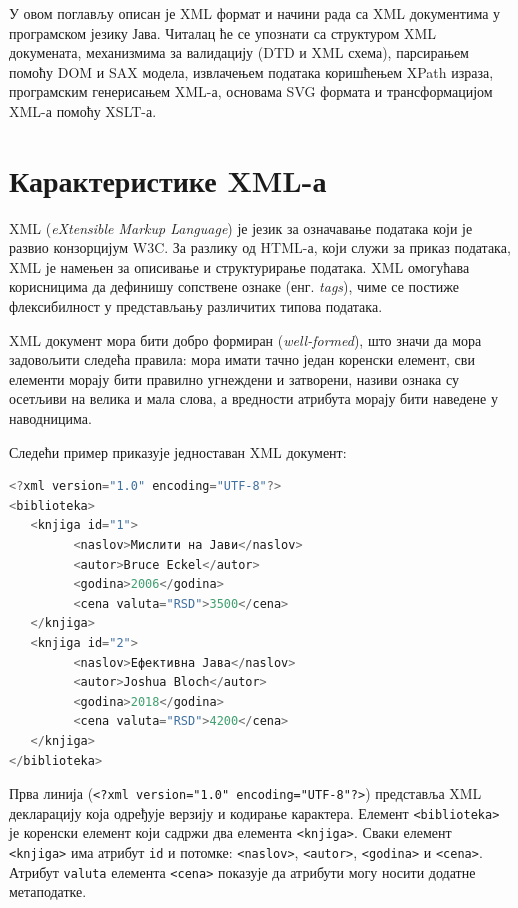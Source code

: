 У овом поглављу описан је XML формат и начини рада са XML документима у програмском језику Јава. Читалац ће се упознати са структуром XML докумената, механизмима за валидацију (DTD и XML схема), парсирањем помоћу DOM и SAX модела, извлачењем података коришћењем XPath израза, програмским генерисањем XML-а, основама SVG формата и трансформацијом XML-а помоћу XSLT-а.


\section{Карактеристике XML-а}

XML (\textit{eXtensible Markup Language}) је језик за означавање података који је развио конзорцијум W3C. За разлику од HTML-а, који служи за приказ података, XML је намењен за описивање и структурирање података. XML омогућава корисницима да дефинишу сопствене ознаке (енг. \textit{tags}), чиме се постиже флексибилност у представљању различитих типова података.

XML документ мора бити добро формиран (\textit{well-formed}), што значи да мора задовољити следећа правила: мора имати тачно један коренски елемент, сви елементи морају бити правилно угнеждени и затворени, називи ознака су осетљиви на велика и мала слова, а вредности атрибута морају бити наведене у наводницима.

Следећи пример приказује једноставан XML документ:


\begin{lstlisting}[language=Java]
<?xml version="1.0" encoding="UTF-8"?>
<biblioteka>
   <knjiga id="1">
         <naslov>Мислити на Јави</naslov>
         <autor>Bruce Eckel</autor>
         <godina>2006</godina>
         <cena valuta="RSD">3500</cena>
   </knjiga>
   <knjiga id="2">
         <naslov>Ефективна Јава</naslov>
         <autor>Joshua Bloch</autor>
         <godina>2018</godina>
         <cena valuta="RSD">4200</cena>
   </knjiga>
</biblioteka>
\end{lstlisting}


Прва линија (\texttt{\textless{}?xml version="1.0" encoding="UTF-8"?\textgreater{}}) представља XML декларацију која одређује верзију и кодирање карактера. Елемент \texttt{\textless{}biblioteka\textgreater{}} је коренски елемент који садржи два елемента \texttt{\textless{}knjiga\textgreater{}}. Сваки елемент \texttt{\textless{}knjiga\textgreater{}} има атрибут \texttt{id} и потомке: \texttt{\textless{}naslov\textgreater{}}, \texttt{\textless{}autor\textgreater{}}, \texttt{\textless{}godina\textgreater{}} и \texttt{\textless{}cena\textgreater{}}. Атрибут \texttt{valuta} елемента \texttt{\textless{}cena\textgreater{}} показује да атрибути могу носити додатне метаподатке.

